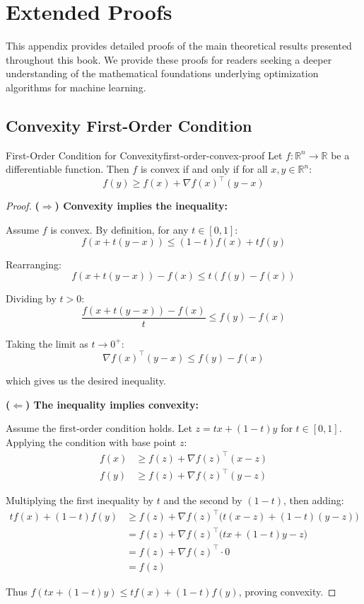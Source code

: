\documentclass[../main.tex]{subfiles}
\begin{document}
\chapter{Extended Proofs}\label{app:proofs}

This appendix provides detailed proofs of the main theoretical results presented throughout this book. We provide these proofs for readers seeking a deeper understanding of the mathematical foundations underlying optimization algorithms for machine learning.

\section{Convexity First-Order Condition}\label{sec:proof-convexity-first-order}

\begin{theorem}{First-Order Condition for Convexity}{first-order-convex-proof}
Let $f: \mathbb{R}^n \to \mathbb{R}$ be a differentiable function. Then $f$ is convex if and only if for all $x, y \in \mathbb{R}^n$:
\[
f(y) \geq f(x) + \nabla f(x)^\top (y - x)
\]
\end{theorem}

\begin{proof}
\textbf{($\Rightarrow$) Convexity implies the inequality:}

Assume $f$ is convex. By definition, for any $t \in [0, 1]$:
\[
f(x + t(y - x)) \leq (1 - t)f(x) + tf(y)
\]

Rearranging:
\[
f(x + t(y - x)) - f(x) \leq t(f(y) - f(x))
\]

Dividing by $t > 0$:
\[
\frac{f(x + t(y - x)) - f(x)}{t} \leq f(y) - f(x)
\]

Taking the limit as $t \to 0^+$:
\[
\nabla f(x)^\top (y - x) \leq f(y) - f(x)
\]

which gives us the desired inequality.

\textbf{($\Leftarrow$) The inequality implies convexity:}

Assume the first-order condition holds. Let $z = tx + (1-t)y$ for $t \in [0, 1]$. Applying the condition with base point $z$:
\begin{align}
f(x) &\geq f(z) + \nabla f(z)^\top (x - z) \\
f(y) &\geq f(z) + \nabla f(z)^\top (y - z)
\end{align}

Multiplying the first inequality by $t$ and the second by $(1-t)$, then adding:
\begin{align}
tf(x) + (1-t)f(y) &\geq f(z) + \nabla f(z)^\top \big(t(x-z) + (1-t)(y-z)\big) \\
&= f(z) + \nabla f(z)^\top \big(tx + (1-t)y - z\big) \\
&= f(z) + \nabla f(z)^\top \cdot 0 \\
&= f(z)
\end{align}

Thus $f(tx + (1-t)y) \leq tf(x) + (1-t)f(y)$, proving convexity.
\end{proof}
\end{document}
